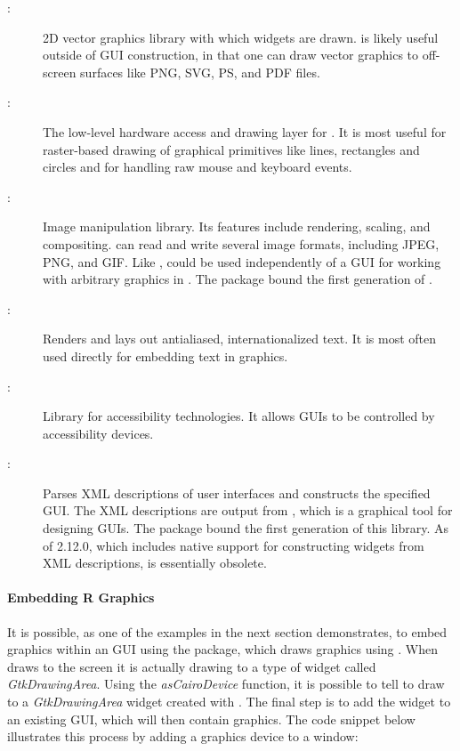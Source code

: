 \documentclass[article]{jss}
\begin{document}
\begin{description}
\item [{:}] 2D vector graphics library with which  widgets are
drawn.  is likely useful outside of GUI construction, in that one
can draw vector graphics to off-screen surfaces like PNG, SVG, PS, and PDF files.
\item [{:}] The low-level hardware access and drawing layer for .
It is most useful for raster-based drawing of graphical primitives like lines,
rectangles and circles and for handling raw mouse and keyboard events.
\item [{:}] Image manipulation library. Its features include 
rendering, scaling, and compositing.  can read and write several image
formats, including JPEG, PNG, and GIF. Like ,  could
be used independently of a GUI for working with arbitrary graphics in .
The  \citep{RGdkPixbuf} package bound the first generation of .
\item [{:}] Renders and lays out antialiased, internationalized text.
It is most often used directly for embedding text in graphics.
\item [{:}] Library for accessibility technologies. It allows 
GUIs to be controlled by accessibility devices.
\item [{:}] Parses XML descriptions of  user interfaces
and constructs the specified GUI. The XML descriptions are output from
, which is a graphical tool for designing GUIs. The 
package \citep{RGtkGlade} bound the first generation of this library. As of 
 2.12.0, which includes native support for constructing widgets from 
XML descriptions,  is essentially obsolete.
\end{description}

\paragraph{Embedding R Graphics}

It is possible, as one of the examples in the next section demonstrates,
to embed  graphics within an  GUI using the 
package, which draws  graphics using . When 
draws to the screen it is actually drawing to a type of  widget called 
\emph{GtkDrawingArea}. Using the \emph{asCairoDevice} function, it is possible
to tell  to draw to a \emph{GtkDrawingArea} widget created 
with . The final step is to add the widget to an existing GUI, 
which will then contain  graphics. 
The code snippet below illustrates this process by adding a graphics device to a window:
\end{document}
